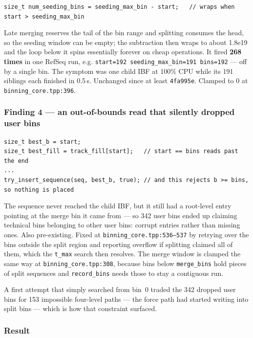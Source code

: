 \documentclass[11pt,a4paper]{article}
\newcommand{\code}[1]{\lstinline[basicstyle=\ttfamily\small]!#1!}
\newcommand{\sha}[1]{\texttt{#1}}
\begin{document}
\begin{lstlisting}[style=codestyle]
size_t num_seeding_bins = seeding_max_bin - start;   // wraps when start > seeding_max_bin
\end{lstlisting}

\noindent Late merging reserves the tail of the bin range and splitting consumes the head, so the
seeding window can be empty; the subtraction then wraps to about 1.8e19 and the loop below it
spins essentially forever on cheap operations. It fired \textbf{268 times} in one RefSeq run, e.g.
\texttt{start=192 seeding\_max\_bin=191 bins=192} --- off by a single bin. The symptom was one
child IBF at 100\% CPU while its 191 siblings each finished in 0.5\,s. Unchanged since at least
\sha{4fa995e}. Clamped to 0 at \texttt{binning\_core.tpp:396}.

\subsubsection*{Finding 4 --- an out-of-bounds read that silently dropped user bins}

\begin{lstlisting}[style=codestyle]
size_t best_b = start;
size_t best_fill = track_fill[start];   // start == bins reads past the end
...
try_insert_sequence(seq, best_b, true); // and this rejects b >= bins, so nothing is placed
\end{lstlisting}

\noindent The sequence never reached the child IBF, but it still had a root-level entry pointing at
the merge bin it came from --- so 342 user bins ended up claiming technical bins belonging to other
user bins: corrupt entries rather than missing ones. Also pre-existing. Fixed at
\texttt{binning\_core.tpp:536--537} by retrying over the bins outside the split region and
reporting overflow if splitting claimed all of them, which the \code{t_max} search then resolves.
The merge window is clamped the same way at \texttt{binning\_core.tpp:308}, because bins below
\code{merge_bins} hold pieces of split sequences and \code{record_bins} needs those to stay a
contiguous run.

\medskip\noindent A first attempt that simply searched from bin~0 traded the 342 dropped user bins
for 153 impossible four-level paths --- the force path had started writing into split bins ---
which is how that constraint surfaced.

\subsubsection*{Result}
\end{document}
